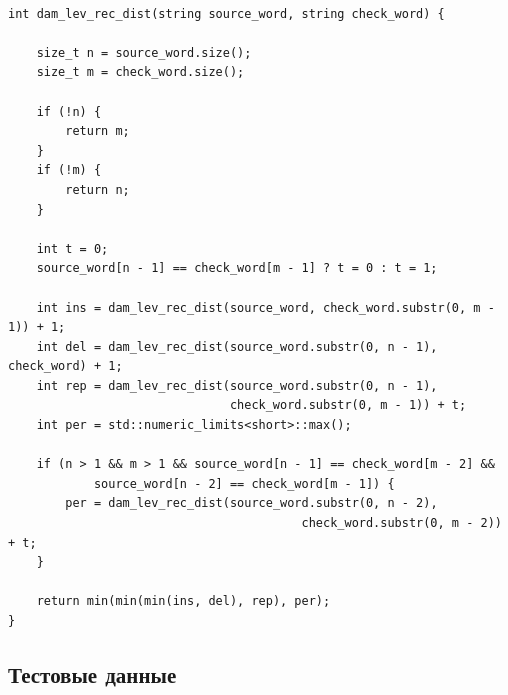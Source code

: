 \documentclass[a4paper,12pt]{article}
\begin{document}
\begin{lstlisting}[label=code_dam_lev_r, caption={Матричный алгоритм Дамерау - Левенштейна}]     

int dam_lev_rec_dist(string source_word, string check_word) {

    size_t n = source_word.size();
    size_t m = check_word.size();

    if (!n) {
        return m;
    }
    if (!m) {
        return n;
    }

    int t = 0;
    source_word[n - 1] == check_word[m - 1] ? t = 0 : t = 1;

    int ins = dam_lev_rec_dist(source_word, check_word.substr(0, m - 1)) + 1;
    int del = dam_lev_rec_dist(source_word.substr(0, n - 1), check_word) + 1;
    int rep = dam_lev_rec_dist(source_word.substr(0, n - 1), 
                               check_word.substr(0, m - 1)) + t;
    int per = std::numeric_limits<short>::max();

    if (n > 1 && m > 1 && source_word[n - 1] == check_word[m - 2] &&
            source_word[n - 2] == check_word[m - 1]) {
        per = dam_lev_rec_dist(source_word.substr(0, n - 2),
                                         check_word.substr(0, m - 2)) + t;
    }
    
    return min(min(min(ins, del), rep), per);
}

\end{lstlisting}  
    
%    
    \subsection{Тестовые данные}
    \label{fig:test_data}
\end{document}
